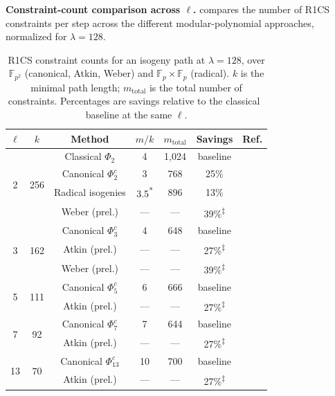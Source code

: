\documentclass[11pt,a4paper]{article}
\theoremstyle{definition}
\theoremstyle{remark}
\newcommand{\F}{\mathbb{F}}
\begin{document}
\medskip\noindent
\textbf{Constraint-count comparison across $\ell$.}
 compares the number of R1CS constraints per step
across the different modular-polynomial approaches, normalized for
$\lambda = 128$.

\begin{table}[H]
	\centering
	\caption{R1CS constraint counts for an isogeny path at $\lambda = 128$,
		over $\F_{p^2}$ (canonical, Atkin, Weber) and $\F_p \times \F_p$
		(radical). $k$ is the minimal path length; $m_{\text{total}}$ is the
		total number of constraints. Percentages are savings relative to the
		classical~\cite{CLL23} baseline at the same $\ell$.}
	\label{tab:r1cs-comparison}
	\begin{tabular}{c c c c c c c}
		\toprule
		$\ell$ & $k$ & Method & $m/k$ & $m_{\text{total}}$ & Savings & Ref. \\
		\midrule
		\multirow{4}{*}{2}
			& \multirow{4}{*}{256}
				& Classical $\Phi_2$     & 4  & 1,024 & baseline & \cite{CLL23} \\
			&  & Canonical $\Phi_2^c$  & 3  & 768   & 25\%    & \cite{canonicalModPoly} \\
			&  & Radical isogenies     & 3.5\textsuperscript{*} & 896 & 13\% & \cite{LP24} \\
			&  & Weber (prel.)         & —  & —     & 39\%\textsuperscript{$\ddagger$} & \cite{AtkinWeber26} \\
		\midrule
		\multirow{3}{*}{3}
			& \multirow{3}{*}{162}
				& Canonical $\Phi_3^c$  & 4  & 648   & baseline & \cite{canonicalModPoly} \\
			&  & Atkin (prel.)         & —  & —     & 27\%\textsuperscript{$\ddagger$} & \cite{AtkinWeber26} \\
			&  & Weber (prel.)         & —  & —     & 39\%\textsuperscript{$\ddagger$} & \cite{AtkinWeber26} \\
		\midrule
		\multirow{2}{*}{5}
			& \multirow{2}{*}{111}
				& Canonical $\Phi_5^c$  & 6  & 666   & baseline & \cite{canonicalModPoly} \\
			&  & Atkin (prel.)         & —  & —     & 27\%\textsuperscript{$\ddagger$} & \cite{AtkinWeber26} \\
		\midrule
		\multirow{2}{*}{7}
			& \multirow{2}{*}{92}
				& Canonical $\Phi_7^c$  & 7  & 644   & baseline & \cite{canonicalModPoly} \\
			&  & Atkin (prel.)         & —  & —     & 27\%\textsuperscript{$\ddagger$} & \cite{AtkinWeber26} \\
		\midrule
		\multirow{2}{*}{13}
			& \multirow{2}{*}{70}
				& Canonical $\Phi_{13}^c$ & 10 & 700  & baseline & \cite{canonicalModPoly} \\
			&  & Atkin (prel.)         & —  & —     & 27\%\textsuperscript{$\ddagger$} & \cite{AtkinWeber26} \\
		\bottomrule
	\end{tabular}


\end{table}
\end{document}
